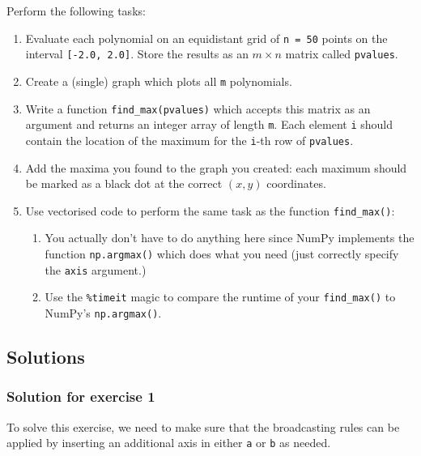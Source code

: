 \documentclass[10pt]{scrartcl}
\providecommand{\tightlist}{%
      \setlength{\itemsep}{0pt}\setlength{\parskip}{0pt}}
\begin{document}
Perform the following tasks:

\begin{enumerate}
\def\labelenumi{\arabic{enumi}.}
\tightlist
\item
  Evaluate each polynomial on an equidistant grid of \texttt{n\ =\ 50}
  points on the interval \texttt{{[}-2.0,\ 2.0{]}}. Store the results as
  an \(m \times n\) matrix called \texttt{pvalues}.
\item
  Create a (single) graph which plots all \texttt{m} polynomials.
\item
  Write a function \texttt{find\_max(pvalues)} which accepts this matrix
  as an argument and returns an integer array of length \texttt{m}. Each
  element \texttt{i} should contain the location of the maximum for the
  \texttt{i}-th row of \texttt{pvalues}.
\item
  Add the maxima you found to the graph you created: each maximum should
  be marked as a black dot at the correct \((x,y)\) coordinates.
\item
  Use vectorised code to perform the same task as the function
  \texttt{find\_max()}:

  \begin{enumerate}
  \def\labelenumii{\arabic{enumii}.}
  \tightlist
  \item
    You actually don't have to do anything here since NumPy implements
    the function \texttt{np.argmax()} which does what you need (just
    correctly specify the \texttt{axis} argument.)
  \item
    Use the \texttt{\%timeit} magic to compare the runtime of your
    \texttt{find\_max()} to NumPy's \texttt{np.argmax()}.
  \end{enumerate}
\end{enumerate}


\hypertarget{solutions}{%
\subsection{Solutions}\label{solutions}}

    \hypertarget{solution-for-exercise-1}{%
\subsubsection{Solution for exercise 1}\label{solution-for-exercise-1}}

To solve this exercise, we need to make sure that the broadcasting rules
can be applied by inserting an additional axis in either \texttt{a} or
\texttt{b} as needed.
\end{document}

